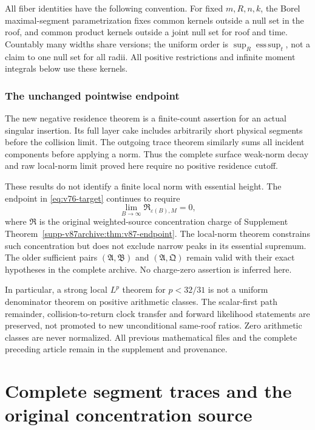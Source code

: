 \documentclass[11pt,reqno]{amsart}
\numberwithin{equation}{section}
\theoremstyle{definition}\newtheorem{definition}[theorem]{Definition}
\theoremstyle{remark}\newtheorem{remark}[theorem]{Remark}
\theoremstyle{definition}\newtheorem{inputstatement}[theorem]{Input statement}
\begin{document}
All fiber identities have the following convention. For fixed
$m,R,n,k$, the Borel maximal-segment parametrization fixes common
kernels outside a null set in the roof, and common product kernels
outside a joint null set for roof and time. Countably many widths
share versions; the uniform order is $\sup_R\operatorname*{ess\,sup}_t$,
not a claim to one null set for all radii. All positive restrictions
and infinite moment integrals below use these kernels.





\section{The unchanged pointwise endpoint}
The new negative residence theorem is a finite-count assertion for an
actual singular insertion. Its full layer cake includes arbitrarily
short physical segments before the collision limit. The outgoing
trace theorem similarly sums all incident components before applying
a norm. Thus the complete surface weak-norm decay and raw local-norm
limit proved here require no positive residence cutoff.

These results do not identify a finite local norm with essential
height. The endpoint in \eqref{eq:v76-target} continues to require
\[
 \lim_{B\to\infty}\mathfrak R_{\varepsilon(B),M}=0,
\]
where $\mathfrak R$ is the original weighted-source concentration
charge of Supplement Theorem~\ref{supp-v87archive:thm:v87-endpoint}.
The local-norm theorem constrains such concentration but does not
exclude narrow peaks in its essential supremum. The older sufficient
pairs $(\mathfrak A,\mathfrak B)$ and $(\mathfrak A,\mathfrak Q)$
remain valid with their exact hypotheses in the complete archive.
No charge-zero assertion is inferred here.

In particular, a strong local $L^p$ theorem for $p<32/31$ is not a
uniform denominator theorem on positive arithmetic classes. The
scalar-first path remainder, collision-to-return clock transfer and
forward likelihood statements are preserved, not promoted to new
unconditional same-roof ratios. Zero arithmetic classes are never
normalized. All previous mathematical files and the complete preceding
article remain in the supplement and provenance.


\endgroup
\part{Complete segment traces and the original concentration source}
\begingroup
\let\ArchiveLabel\label
\let\ArchiveRef\ref
\renewcommand{\label}[1]{\ArchiveLabel{v87archive:#1}}
\renewcommand{\ref}[1]{%
  \IfBeginWith{#1}{supp-}{%
    \StrBehind{#1}{supp-}[\ArchiveTarget]%
    \ArchiveRef{\ArchiveTarget}%
  }{\ArchiveRef{v87archive:#1}}%
}
\makeatletter
\let\ltx@label\label
\makeatother
\let\ArchivePageRef\pageref
\renewcommand{\pageref}[1]{%
  \IfBeginWith{#1}{supp-}{%
    \StrBehind{#1}{supp-}[\ArchivePageTarget]%
    \ArchivePageRef{\ArchivePageTarget}%
  }{\ArchivePageRef{v87archive:#1}}%
}
\end{document}
